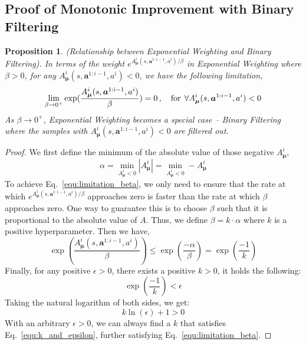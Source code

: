 \documentclass[11pt]{article}
\theoremstyle{plain}
\newtheorem{proposition}[theorem]{Proposition}
\theoremstyle{remark}
\begin{document}
\subsection{Proof of Monotonic Improvement with Binary Filtering}\label{appendix:binary_filtering}
\begin{proposition}
(Relationship between Exponential Weighting and Binary Filtering). In terms of the weight $e^{A^{i}_{\boldsymbol{\mu}}(s, \boldsymbol{a}^{1:i-1}, a^i) / \beta}$ in Exponential Weighting where $\beta > 0$, for any $A^{i}_{\boldsymbol{\mu}}(s, \boldsymbol{a}^{1:i-1}, a^i) < 0$, we have the following limitation,
\begin{equation}
\label{equ:limitation_beta}
    \lim\limits_{\beta \rightarrow 0^{+}} \exp(\frac{{A^{i}_{\boldsymbol{\mu}}(s, \boldsymbol{a}^{1:i-1}, a^i)}}{\beta}) = 0\, , \quad {\rm for\:\:}\forall A^{i}_{\boldsymbol{\mu}}(s, \boldsymbol{a}^{1:i-1}, a^i) < 0
\end{equation}
As $\beta \rightarrow 0^{+}$, Exponential Weighting becomes a special case -- Binary Filtering where the samples with $A^{i}_{\boldsymbol{\mu}}(s, \boldsymbol{a}^{1:i-1}, a^i) < 0$ are filtered out.
\end{proposition}
\begin{proof}
We first define the minimum of the absolute value of those negative $A_{\boldsymbol{\mu}}^{i}$,
\begin{equation*}
    \alpha = \min\limits_{A_{\boldsymbol{\mu}}^{i} < 0} |A_{\boldsymbol{\mu}}^{i}| = \min\limits_{A_{\boldsymbol{\mu}}^{i} < 0} - A_{\boldsymbol{\mu}}^{i}
\end{equation*}
To achieve Eq.~\eqref{equ:limitation_beta}, we only need to ensure that the rate at which $e^{A^{i}_{\boldsymbol{\mu}}(s, \boldsymbol{a}^{1:i-1}, a^i) / \beta}$ approaches zero is faster than the rate at which $\beta$ approaches zero.
One way to guarantee this is to choose $\beta$ such that it is proportional to the absolute value of $A$. Thus, we define $\beta = k \cdot \alpha$ where $k$ is a positive hyperparameter.
Then we have,
\begin{equation*}
    \exp\left(\frac{{A^{i}_{\boldsymbol{\mu}}(s, \boldsymbol{a}^{1:i-1}, a^i)}}{\beta} \right) \leq \exp\left(\frac{-\alpha}{\beta} \right) = \exp\left(\frac{-1}{k}\right)
\end{equation*}
Finally, for any positive $\epsilon > 0$, there exists a positive $k > 0$, it holds the following:
\begin{equation*}
    \exp \left(\frac{-1}{k} \right) < \epsilon
\end{equation*}
Taking the natural logarithm of both sides, we get:
\begin{equation}
\label{equ:k_and_epsilon}
    k \ln (\epsilon) + 1 > 0
\end{equation}
With an arbitrary $\epsilon > 0$, we can always find a $k$ that satisfies Eq.~\eqref{equ:k_and_epsilon}, further satisfying Eq.~\eqref{equ:limitation_beta}.
\end{proof}
\end{document}
